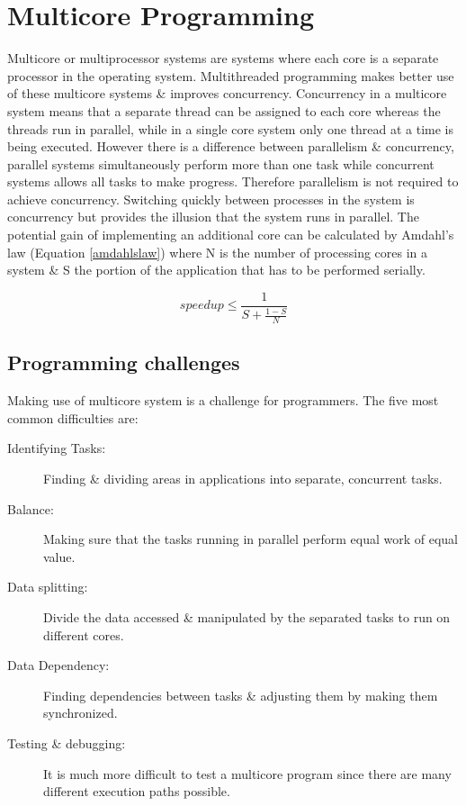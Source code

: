 \documentclass[a4paper,11pt]{article}
\begin{document}
\newpage\section{Multicore Programming}
Multicore or multiprocessor systems are systems where each core is a separate processor in the operating system. Multithreaded programming makes better use of these multicore systems \& improves concurrency. Concurrency in a multicore system means that a separate thread can be assigned to each core whereas the threads run in parallel, while in a single core system only one thread at a time is being executed. However there is a difference between parallelism \& concurrency, parallel systems simultaneously perform more than one task while concurrent systems allows all tasks to make progress. Therefore parallelism is not required to achieve concurrency. Switching quickly between processes in the system is concurrency but provides the illusion that the system runs in parallel.
\newline\indent The potential gain of implementing an additional core can be calculated by Amdahl’s law (Equation \ref{amdahlslaw}) where N is the number of processing cores in a system \& S the portion of the application that has to be performed serially. 

\begin{equation}
\label{amdahlslaw}
    speedup \leq \frac{1}{S+\frac{1-S}{N}}
\end{equation}
\subsection{Programming challenges}

Making use of multicore system is a challenge for programmers. The five most common difficulties are: 

\begin{description}
    \item [Identifying Tasks:] Finding \& dividing areas in applications into separate, concurrent tasks.  
    \item [Balance:] Making sure that the tasks running in parallel perform equal work of equal value. 
    \item [Data splitting:] Divide the data accessed \& manipulated by the separated tasks to run on different cores.
    \item [Data Dependency:] Finding dependencies between tasks \& adjusting them by making them synchronized.
    \item [Testing \& debugging:] It is much more difficult to test a multicore program since there are many different execution paths possible. 
\end{description}
\end{document}
